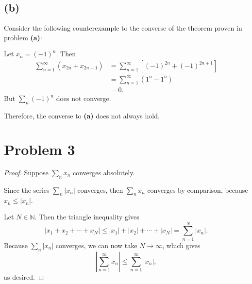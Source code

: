 \documentclass{article}
\begin{document}
\subsection*{(b)}
Consider the following counterexample to the converse of the theorem proven in problem \textbf{(a)}:

Let $x_n = (-1)^n$. Then 
\begin{align}
	\sum_{n=1}^{\infty}\left(x_{2n} +x_{2n+1}\right) &= \sum_{n=1}^{\infty}\left[(-1)^{2n} + (-1)^{2n+1}\right] \\
	&= \sum_{n=1}^{\infty}\left(1^n - 1^n \right) \\
	&= 0.
\end{align}
But $\sum_n (-1)^n$ does not converge. 

Therefore, the converse to \textbf{(a)} does not always hold.
\section*{Problem 3}
\begin{proof}
	Suppose $\sum_n x_n$ converges absolutely.
	
	Since the series $\sum_n |x_n|$ converges, then $\sum_n x_n$ converges by comparison, because $x_n \leq |x_n|$.
	
	Let $N \in \mathbb{N}$. Then the triangle inequality gives
	\begin{equation}
		|x_1 + x_2 + \cdots + x_N| \leq |x_1| + |x_2| + \cdots + |x_N| = \sum_{n=1}^{N}|x_n|.
	\end{equation}
	Because $\sum_n |x_n|$ converges, we can now take $N \to \infty$, which gives
	\begin{equation}
		\left|\sum_{n=1}^{\infty} x_n \right| \leq \sum_{n=1}^{\infty} |x_n|,
	\end{equation}
	as desired.
\end{proof}
\end{document}
